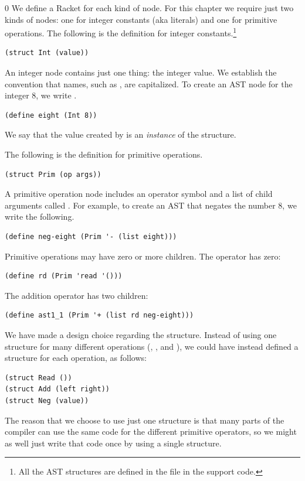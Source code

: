 \documentclass[7x10]{TimesAPriori_MIT}%
\def\racketEd{0}
\providecommand{\BookEdition}{1}
\let\edition\BookEdition
\numberwithin{theorem}{chapter}
\numberwithin{definition}{chapter}
\numberwithin{equation}{chapter}
\begin{document}
{\if\edition\racketEd
We define a Racket  for each kind of node.  For this
chapter we require just two kinds of nodes: one for integer constants
(aka literals)
and one for primitive operations.  The following is the 
definition for integer constants.\footnote{All the AST structures are
defined in the file  in the support code.}
\begin{lstlisting}
(struct Int (value))
\end{lstlisting}
An integer node contains just one thing: the integer value.
We establish the convention that  names, such
as , are capitalized.
To create an AST node for the integer $8$, we write .
\begin{lstlisting}
(define eight (Int 8))
\end{lstlisting}
We say that the value created by  is an
\emph{instance} of the
 structure.

The following is the  definition for primitive operations.
\begin{lstlisting}
(struct Prim (op args))
\end{lstlisting}
A primitive operation node includes an operator symbol  and a
list of child arguments called . For example, to create an
AST that negates the number $8$, we write the following.
\begin{lstlisting}
(define neg-eight (Prim '- (list eight)))
\end{lstlisting}
Primitive operations may have zero or more children. The 
operator has zero:
\begin{lstlisting}
(define rd (Prim 'read '()))
\end{lstlisting}
The addition operator has two children:
\begin{lstlisting}
(define ast1_1 (Prim '+ (list rd neg-eight)))
\end{lstlisting}

We have made a design choice regarding the  structure.
Instead of using one structure for many different operations
(, \code{+}, and \code{-}), we could have instead defined a
structure for each operation, as follows:
\begin{lstlisting}
(struct Read ())
(struct Add (left right))
(struct Neg (value))
\end{lstlisting}
The reason that we choose to use just one structure is that many parts
of the compiler can use the same code for the different primitive
operators, so we might as well just write that code once by using a
single structure.
%
\fi}
\end{document}
